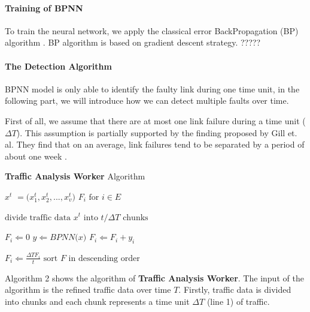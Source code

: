 \documentclass{sig-alternate-05-2015}
\begin{document}
\paragraph{Training of BPNN}
To train the neural network, we apply the classical error BackPropagation (BP) algorithm \cite{rumelhart1988learning}. BP algorithm is based on gradient descent strategy.
????? %

\paragraph{The Detection Algorithm}
BPNN model is only able to identify the faulty link during one time unit, in the following part, we will introduce how we can detect multiple faults over time.

First of all, we assume that there are at most one link failure during a time unit ($\Delta T$). This assumption is partially supported by the finding proposed by Gill et. al. They find that on an average, link failures tend to be separated by a period of about one week \cite{gill2011understanding}.

\renewcommand{\algorithmicrequire}{\textbf{Input:}}
\renewcommand{\algorithmicensure}{\textbf{Output:}}
\begin{algorithm}
	\caption{\textbf{Traffic Analysis Worker} Algorithm}
	\begin{algorithmic}[1]
        \REQUIRE \boldmath $x^t$ \unboldmath$=($\boldmath $x_1^t, x_2^t, ..., x_v^t$\unboldmath $)$
		\ENSURE $F_i \text{ for } i \in E$

        \STATE $\text{divide traffic data }$\boldmath $x^t$$\text{ into }$\unboldmath $t/\Delta T \text{ chunks}$

            \STATE $F_i \Leftarrow 0$
        \ENDFOR
        \STATE \boldmath $y$\unboldmath $\Leftarrow BPNN($\boldmath $x$\unboldmath $)$
                \STATE $F_i \Leftarrow F_i + y_i$
            \ENDFOR
        \ENDFOR

            \STATE $F_i \Leftarrow \frac{\Delta T F_i}{t}$
        \ENDFOR
        \STATE $\text{sort }$\boldmath $F$\unboldmath$\text{ in descending order}$
	\end{algorithmic}
\end{algorithm}

Algorithm 2 shows the algorithm of \textbf{Traffic Analysis Worker}. The input of the algorithm is the refined traffic data over time $T$. Firstly, traffic data is divided into chunks and each chunk represents a time unit $\Delta T$ (line 1) of traffic.
\end{document}

